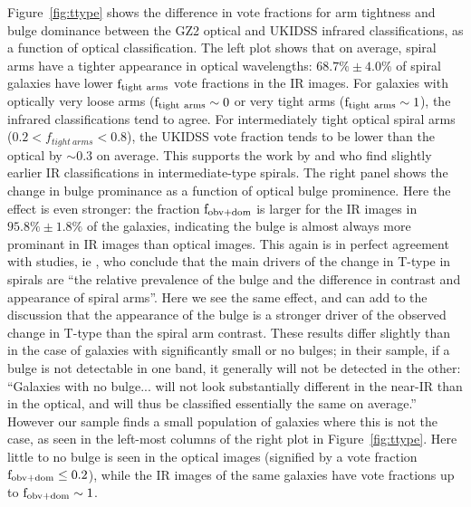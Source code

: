 Figure~\ref{fig:ttype} shows the difference in vote fractions for arm tightness and bulge dominance between the GZ2 optical and UKIDSS infrared classifications, as a function of optical classification. The left plot shows that on average, spiral arms have a tighter appearance in optical wavelengths: $68.7\% \pm 4.0\%$ of spiral galaxies have lower $\rm f_{tight~arms}$ vote fractions in the IR images. For galaxies with optically very loose arms ($\rm f_{tight~arms} \sim 0$ or very tight arms ($\rm f_{tight~arms} \sim 1$), the infrared classifications tend to agree. For intermediately tight optical spiral arms ($0.2 < f_{tight~arms} < 0.8$), the UKIDSS vote fraction tends to be lower than the optical by $\sim 0.3$ on average. This supports the work by \citet{Eskridge2002} and \citet{Buta2010} who find slightly earlier IR classifications in intermediate-type spirals. The right panel shows the change in bulge prominance as a function of optical bulge prominence. Here the effect is even stronger: the fraction $\rm f_{obv+dom}$ is larger for the IR images in $95.8\% \pm 1.8\%$ of the galaxies, indicating the bulge is almost always more prominant in IR images than optical images. This again is in perfect agreement with studies, ie \citet{Eskridge2002}, who conclude that the main drivers of the change in T-type in spirals are ``the relative prevalence of the bulge and the difference in contrast and appearance of spiral arms''. Here we see the same effect, and can add to the discussion that the appearance of the bulge is a stronger driver of the observed change in T-type than the spiral arm contrast. These results differ slightly than \citet{Eskridge2002} in the case of galaxies with significantly small or no bulges; in their sample, if a bulge is not detectable in one band, it generally will not be detected in the other: ``Galaxies with no bulge... will not look substantially different in the near-IR than in the optical, and will thus be classified essentially the same on average.'' However our sample finds a small population of galaxies where this is not the case, as seen in the left-most columns of the right plot in Figure~\ref{fig:ttype}. Here little to no bulge is seen in the optical images (signified by a vote fraction $\rm f_{obv+dom} \le 0.2$), while the IR images of the same galaxies have vote fractions up to $\rm f_{obv+dom} \sim 1$. 


